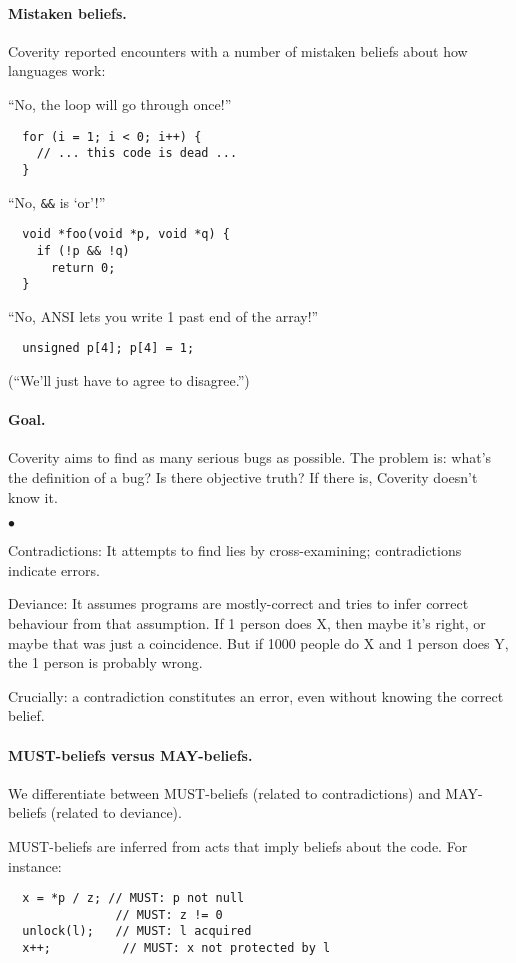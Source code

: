 \documentclass[11pt]{article}
\newcommand{\squishlist}{
 \begin{list}{$\bullet$}
  { \setlength{\itemsep}{0pt}
     \setlength{\parsep}{3pt}
     \setlength{\topsep}{3pt}
     \setlength{\partopsep}{0pt}
     \setlength{\leftmargin}{1.5em}
     \setlength{\labelwidth}{1em}
     \setlength{\labelsep}{0.5em} } }
\newcommand{\squishend}{
  \end{list}  }
\begin{document}
\paragraph{Mistaken beliefs.} Coverity reported encounters with a number
of mistaken beliefs about how languages work:

``No, the loop will go through once!''
\begin{lstlisting}
  for (i = 1; i < 0; i++) {
    // ... this code is dead ...
  }
\end{lstlisting}

``No, {\tt \&\&} is `or'!''
\begin{lstlisting}
  void *foo(void *p, void *q) {
    if (!p && !q)
      return 0;
  }
\end{lstlisting}

``No, ANSI lets you write 1 past end of the array!''
\begin{lstlisting}
  unsigned p[4]; p[4] = 1;
\end{lstlisting}
(``We'll just have to agree to disagree.'')

\paragraph{Goal.} Coverity aims to find as many serious bugs as possible.
The problem is: what's the definition of a bug? Is there objective truth?
If there is, Coverity doesn't know it.

\squishlist
\item Contradictions: It attempts to find lies by cross-examining; contradictions
indicate errors.
\item Deviance: It assumes programs are mostly-correct and tries to infer
  correct behaviour from that assumption. If 1 person does X, then maybe it's right,
  or maybe that was just a coincidence. But if 1000 people do X and 1 person does Y,
  the 1 person is probably wrong.
\squishend

Crucially: a contradiction constitutes an error, even without knowing
the correct belief.

\paragraph{MUST-beliefs versus MAY-beliefs.} We differentiate between MUST-beliefs
(related to contradictions) and MAY-beliefs (related to deviance).

MUST-beliefs are inferred from acts that imply beliefs about the code.
For instance:
\begin{lstlisting}
  x = *p / z; // MUST: p not null
               // MUST: z != 0
  unlock(l);   // MUST: l acquired
  x++;          // MUST: x not protected by l
\end{lstlisting}
\end{document}

